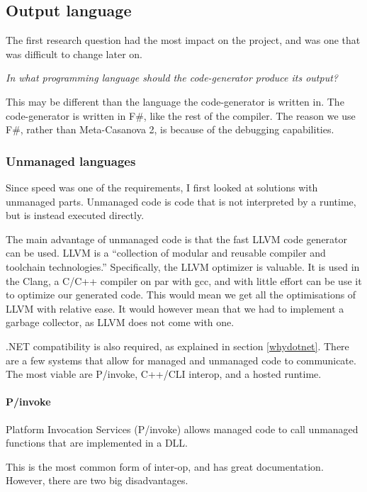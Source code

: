 \subsection{Output language}
The first research question had the most impact on the project, and was one that was difficult to change later on.

\textit{In what programming language should the code-generator produce its output?}

This may be different than the language the code-generator is written in.
The code-generator is written in F\#, like the rest of the compiler.
The reason we use F\#, rather than Meta-Casanova 2, is because of the debugging capabilities.

\subsubsection{Unmanaged languages}
Since speed was one of the requirements, I first looked at solutions with unmanaged parts.
Unmanaged code is code that is not interpreted by a runtime, but is instead executed directly.

The main advantage of unmanaged code is that the fast LLVM code generator can be used.
LLVM is a ``collection of modular and reusable compiler and toolchain technologies.''\cite{llvm}
Specifically, the LLVM optimizer is valuable.
It is used in the Clang, a C/C++ compiler on par with gcc, and with little effort can be use it to optimize our generated code.
This would mean we get all the optimisations of LLVM with relative ease.
It would however mean that we had to implement a garbage collector, as LLVM does not come with one.
 
.NET compatibility is also required, as explained in section \ref{whydotnet}.
There are a few systems that allow for managed and unmanaged code to communicate.
The most viable are P/invoke, C++/CLI interop, and a hosted runtime.

\paragraph{P/invoke}
Platform Invocation Services (P/invoke) allows managed code to call unmanaged functions that are implemented in a DLL.\cite{msdn_pinvoke}

This is the most common form of inter-op, and has great documentation.
However, there are two big disadvantages.

